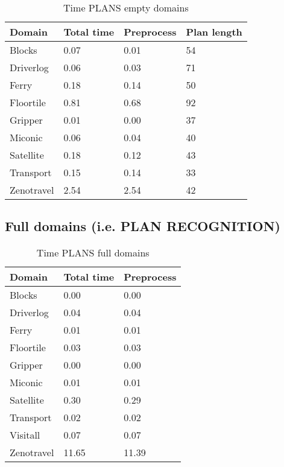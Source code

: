 \documentclass[]{article}
\begin{document}
\begin{table}[H]
	\caption{Time PLANS empty domains}
	\label{tab:time_plans_partial}
	\begin{center}
		\begin{tabular}{l|l|l|l|}			 
			Domain & Total time & Preprocess & Plan length  \\
			\hline
			Blocks & 0.07 & 0.01 & 54  \\
			Driverlog & 0.06 & 0.03 & 71 \\
			Ferry & 0.18 & 0.14 & 50 \\
			Floortile & 0.81 & 0.68 & 92 \\
			Gripper & 0.01 & 0.00 & 37 \\
			Miconic & 0.06 & 0.04 & 40  \\
			Satellite & 0.18 & 0.12 & 43 \\
			Transport & 0.15 & 0.14 & 33 \\
			Zenotravel & 2.54 & 2.54 & 42 \\
		\end{tabular}
	\end{center}	
\end{table}

\subsection{Full domains (i.e. PLAN RECOGNITION)}

\begin{table}[H]
	\caption{Time PLANS full domains}
	\label{tab:time_plans_full}
	\begin{center}
		\begin{tabular}{l|l|l|}			 
			Domain & Total time & Preprocess \\
			\hline
			Blocks & 0.00 & 0.00 \\
			Driverlog & 0.04 & 0.04 \\
			Ferry & 0.01 & 0.01 \\
			Floortile & 0.03 & 0.03 \\
			Gripper & 0.00 & 0.00 \\
			Miconic & 0.01 & 0.01 \\
			Satellite & 0.30 & 0.29 \\
			Transport & 0.02 & 0.02 \\
			Visitall & 0.07 & 0.07  \\
			Zenotravel & 11.65 & 11.39  \\
		\end{tabular}
	\end{center}	
\end{table}
\end{document}
